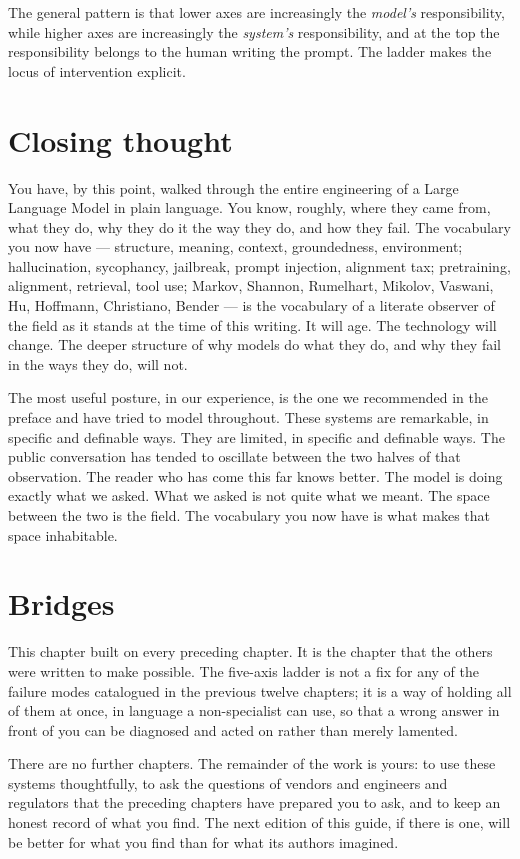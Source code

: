 The general pattern is that lower axes are increasingly the
\emph{model's} responsibility, while higher axes are
increasingly the \emph{system's} responsibility, and at the
top the responsibility belongs to the human writing the
prompt. The ladder makes the locus of intervention explicit.


\section*{Closing thought}

You have, by this point, walked through the entire engineering
of a Large Language Model in plain language. You know,
roughly, where they came from, what they do, why they do it
the way they do, and how they fail. The vocabulary you now
have --- structure, meaning, context, groundedness, environment;
hallucination, sycophancy, jailbreak, prompt injection,
alignment tax; pretraining, alignment, retrieval, tool
use; Markov, Shannon, Rumelhart, Mikolov, Vaswani, Hu,
Hoffmann, Christiano, Bender --- is the vocabulary of a
literate observer of the field as it stands at the time of
this writing. It will age. The technology will change. The
deeper structure of why models do what they do, and why they
fail in the ways they do, will not.

The most useful posture, in our experience, is the one we
recommended in the preface and have tried to model throughout.
These systems are remarkable, in specific and definable ways.
They are limited, in specific and definable ways. The public
conversation has tended to oscillate between the two halves
of that observation. The reader who has come this far knows
better. The model is doing exactly what we asked. What we
asked is not quite what we meant. The space between the two is
the field. The vocabulary you now have is what makes that
space inhabitable.

\section*{Bridges}

This chapter built on every preceding chapter. It is the
chapter that the others were written to make possible. The
five-axis ladder is not a fix for any of the failure modes
catalogued in the previous twelve chapters; it is a way of
holding all of them at once, in language a non-specialist can
use, so that a wrong answer in front of you can be diagnosed
and acted on rather than merely lamented.

There are no further chapters. The remainder of the work is
yours: to use these systems thoughtfully, to ask the
questions of vendors and engineers and regulators that the
preceding chapters have prepared you to ask, and to keep an
honest record of what you find. The next edition of this
guide, if there is one, will be better for what you find than
for what its authors imagined.

